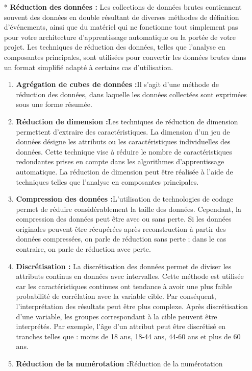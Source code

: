 \documentclass[a4paper, 12pt]{article}
\begin{document}
	\begin{itemize}
		\item[*] \textbf{Réduction des données :} Les collections de données brutes contiennent souvent des données en double résultant de diverses méthodes de définition d'événements, ainsi que du matériel qui ne fonctionne tout simplement pas pour votre architecture d'apprentissage automatique ou la portée de votre projet.
		Les techniques de réduction des données, telles que l’analyse en composantes principales, sont utilisées pour convertir les données brutes dans un format simplifié adapté à certains cas d’utilisation.
		\begin{enumerate}
			\item {\textbf{Agrégation de cubes de données :}}Il s’agit d’une méthode de réduction des données, dans laquelle les données collectées sont exprimées sous une forme résumée. 
			\item {\textbf{Réduction de dimension :}}Les techniques de réduction de dimension permettent d'extraire des caractéristiques. La dimension d'un jeu de données désigne les attributs ou les caractéristiques individuelles des données. Cette technique vise à réduire le nombre de caractéristiques redondantes prises en compte dans les algorithmes d'apprentissage automatique. La réduction de dimension peut être réalisée à l'aide de techniques telles que l'analyse en composantes principales.
			\item {\textbf{Compression des données :}}L'utilisation de technologies de codage permet de réduire considérablement la taille des données. Cependant, la compression des données peut être avec ou sans perte. Si les données originales peuvent être récupérées après reconstruction à partir des données compressées, on parle de réduction sans perte ; dans le cas contraire, on parle de réduction avec perte. 
			\item {\textbf{Discrétisation :}}
			La discrétisation des données permet de diviser les attributs continus en données avec intervalles. Cette méthode est utilisée car les caractéristiques continues ont tendance à avoir une plus faible probabilité de corrélation avec la variable cible. Par conséquent, l'interprétation des résultats peut être plus complexe. Après discrétisation d'une variable, les groupes correspondant à la cible peuvent être interprétés. Par exemple, l'âge d'un attribut peut être discrétisé en tranches telles que : moins de 18 ans, 18-44 ans, 44-60 ans et plus de 60 ans.
			\item {\textbf{Réduction de la numérotation :}}Réduction de la numérotation

\end{enumerate}
\end{itemize}
\end{document}
